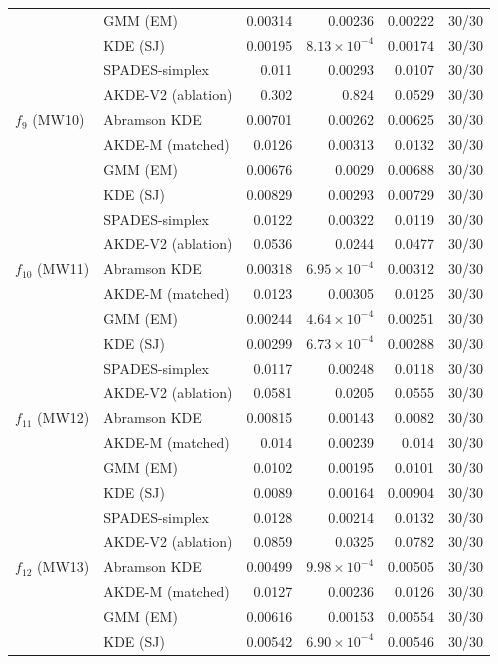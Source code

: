 \begin{tabular}{llrrrr}
 & GMM (EM) & 0.00314 & 0.00236 & 0.00222 & 30/30 \\
 & KDE (SJ) & 0.00195 & $8.13\times10^{-4}$ & 0.00174 & 30/30 \\
 & SPADES-simplex & 0.011 & 0.00293 & 0.0107 & 30/30 \\
 & AKDE-V2 (ablation) & 0.302 & 0.824 & 0.0529 & 30/30 \\
$f_{9}$ (MW10) & Abramson KDE & 0.00701 & 0.00262 & 0.00625 & 30/30 \\
 & AKDE-M (matched) & 0.0126 & 0.00313 & 0.0132 & 30/30 \\
 & GMM (EM) & 0.00676 & 0.0029 & 0.00688 & 30/30 \\
 & KDE (SJ) & 0.00829 & 0.00293 & 0.00729 & 30/30 \\
 & SPADES-simplex & 0.0122 & 0.00322 & 0.0119 & 30/30 \\
 & AKDE-V2 (ablation) & 0.0536 & 0.0244 & 0.0477 & 30/30 \\
$f_{10}$ (MW11) & Abramson KDE & 0.00318 & $6.95\times10^{-4}$ & 0.00312 & 30/30 \\
 & AKDE-M (matched) & 0.0123 & 0.00305 & 0.0125 & 30/30 \\
 & GMM (EM) & 0.00244 & $4.64\times10^{-4}$ & 0.00251 & 30/30 \\
 & KDE (SJ) & 0.00299 & $6.73\times10^{-4}$ & 0.00288 & 30/30 \\
 & SPADES-simplex & 0.0117 & 0.00248 & 0.0118 & 30/30 \\
 & AKDE-V2 (ablation) & 0.0581 & 0.0205 & 0.0555 & 30/30 \\
$f_{11}$ (MW12) & Abramson KDE & 0.00815 & 0.00143 & 0.0082 & 30/30 \\
 & AKDE-M (matched) & 0.014 & 0.00239 & 0.014 & 30/30 \\
 & GMM (EM) & 0.0102 & 0.00195 & 0.0101 & 30/30 \\
 & KDE (SJ) & 0.0089 & 0.00164 & 0.00904 & 30/30 \\
 & SPADES-simplex & 0.0128 & 0.00214 & 0.0132 & 30/30 \\
 & AKDE-V2 (ablation) & 0.0859 & 0.0325 & 0.0782 & 30/30 \\
$f_{12}$ (MW13) & Abramson KDE & 0.00499 & $9.98\times10^{-4}$ & 0.00505 & 30/30 \\
 & AKDE-M (matched) & 0.0127 & 0.00236 & 0.0126 & 30/30 \\
 & GMM (EM) & 0.00616 & 0.00153 & 0.00554 & 30/30 \\
 & KDE (SJ) & 0.00542 & $6.90\times10^{-4}$ & 0.00546 & 30/30 \\

\end{tabular}
